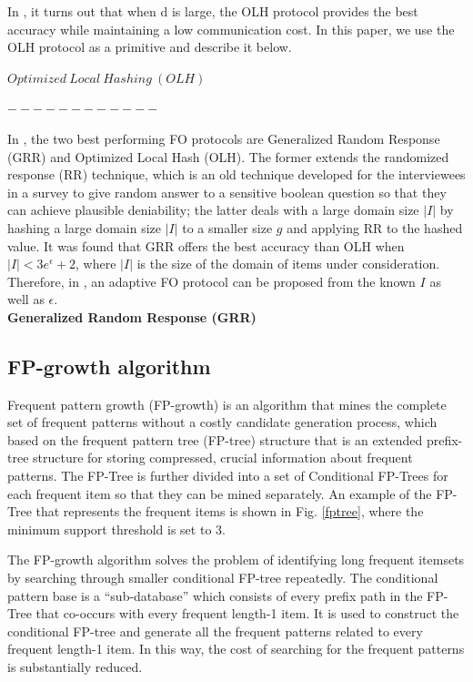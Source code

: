 \documentclass[conference]{IEEEtran}
\begin{document}
In \cite{a8}, it turns out that when d is large, the OLH protocol provides the best accuracy while maintaining a low communication cost.  In this paper, we use the OLH protocol as a primitive and describe it below.

$Optimized\ Local\ Hashing\ (OLH)$

$------------$

{\color{red}In \cite{a8}, the two best performing FO protocols are Generalized Random Response (GRR) and Optimized Local Hash (OLH). The former extends the randomized response (RR) technique\cite{rr}, which is an old technique developed for the interviewees in a survey to give random answer to a sensitive boolean question so that they can achieve plausible deniability; the latter deals with a large domain size $|I|$ by hashing a large domain size $|I|$ to a smaller size $g$ and applying RR to the hashed value. It was found that GRR offers the best accuracy than OLH when $|I| < 3e^{\epsilon} + 2$, where $|I|$ is the size of the domain of items under consideration. Therefore, in  \cite{a2}, an adaptive FO protocol can be proposed from the known $I$ as well as $\epsilon$.\\}
\textbf{Generalized Random Response (GRR)}

\subsection{FP-growth algorithm}
Frequent pattern growth (FP-growth)\cite{fp} is an algorithm that mines the complete set of frequent patterns without a costly candidate generation process, which based on the frequent pattern tree (FP-tree) structure that is an extended prefix-tree structure for storing compressed, crucial information about frequent patterns. The FP-Tree is further divided into a set of Conditional FP-Trees for each frequent item so that they can be mined separately. An example of the FP-Tree that represents the frequent items is shown in Fig. \ref{fptree}, where the minimum support threshold is set to 3.


The FP-growth algorithm solves the problem of identifying long frequent itemsets by searching through smaller conditional FP-tree repeatedly. The conditional pattern base is a “sub-database” which consists of every prefix path in the FP-Tree that co-occurs with every frequent length-1 item. It is used to construct the conditional FP-tree and generate all the frequent patterns related to every frequent length-1 item. In this way, the cost of searching for the frequent patterns is substantially reduced.
\end{document}
